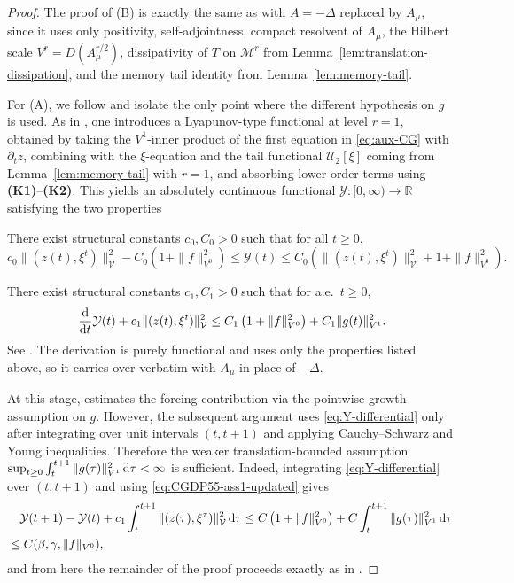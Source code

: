 \documentclass[12pt,leqno]{amsart}
\def\d{{\rm d}}
\def\R {\mathbb{R}}
\def\pt {{\partial_t}}
\theoremstyle{definition}
\numberwithin{equation}{section}
\numberwithin{figure}{section}
\begin{document}
\begin{proof}
The proof of \textup{(B)} is exactly the same as \cite[Lemma~5.6]{CGDP2010} with $A=-\Delta$ replaced by $A_\mu$,
since it uses only positivity, self-adjointness, compact resolvent of $A_\mu$, the Hilbert scale $V^r=D(A_\mu^{r/2})$,
dissipativity of $T$ on $\mathcal M^r$  from Lemma~\ref{lem:translation-dissipation}, and the memory tail identity
from Lemma~\ref{lem:memory-tail}.

\smallskip
For \textup{(A)}, we follow \cite[Lemma~5.5]{CGDP2010} and isolate the only point where the different hypothesis on $g$ is used.
As in \cite[Section~5]{CGDP2010}, one introduces a Lyapunov-type functional at level $r=1$,
obtained by taking the ${V^1}$-inner product of the first equation in \eqref{eq:aux-CG} with $\pt z$,
combining with the $\xi$-equation and the tail functional $\mathcal U_2[\xi]$ coming from Lemma~\ref{lem:memory-tail} with $r=1$,
and absorbing lower-order terms using \textbf{(K1)}--\textbf{(K2)}. This yields an absolutely continuous functional
$\mathcal Y:[0,\infty)\to\R$ satisfying the two properties

\smallskip
{} There exist structural constants $c_0,C_0>0$ such that for all $t\ge0$,
\begin{equation}\label{eq:Y-equivalence} 
c_0\|(z(t),\xi^t)\|_{\mathcal V}^2 - C_0(1+\|f\|_{V^0}^2)\le \mathcal Y(t)
\le C_0\left(\|(z(t),\xi^t)\|_{\mathcal V}^2 + 1+\|f\|_{V^0}^2\right).
\end{equation}

\smallskip
{} There exist structural constants $c_1,C_1>0$ such that for a.e.\ $t\ge0$,
\begin{equation}\label{eq:Y-differential} \
\frac{\d}{\d t}\mathcal Y(t) + c_1\|(z(t),\xi^t)\|_{\mathcal V}^2
\le C_1\left(1+\|f\|_{V^0}^2\right) + C_1\|g(t)\|_{{V^1}}^2.
\end{equation}
See \cite[(5.14)--(5.20)]{CGDP2010}. The derivation is purely functional and uses only the properties listed above,
so it carries over verbatim with $A_\mu$ in place of $-\Delta$.


At this stage, \cite[Lemma~5.5]{CGDP2010} estimates the forcing contribution via the pointwise growth assumption on $g$.
However, the subsequent argument uses \eqref{eq:Y-differential} only after integrating over unit intervals $(t,t+1)$ and
applying Cauchy--Schwarz and Young inequalities. Therefore the weaker translation-bounded assumption
$\sup_{t\ge0}\int_t^{t+1}\|g(\tau)\|_{{V^1}}^2\,\d\tau<\infty$ is sufficient.
Indeed, integrating \eqref{eq:Y-differential} over $(t,t+1)$ and using \eqref{eq:CGDP55-ass1-updated} gives
\[
\begin{split} &\quad
\mathcal Y(t+1)-\mathcal Y(t) + c_1\int_t^{t+1}\|(z(\tau),\xi^\tau)\|_{\mathcal V}^2\,\d\tau
\le C\left(1+\|f\|_{V^0}^2\right)+C\int_t^{t+1}\|g(\tau)\|_{{V^1}}^2\,\d\tau
\\ &\le C(\beta,\gamma,\|f\|_{V^0}),
\end{split}
\]
and from here the remainder of the proof proceeds exactly as in \cite[Lemma~5.5]{CGDP2010}.
\end{proof}
\end{document}
